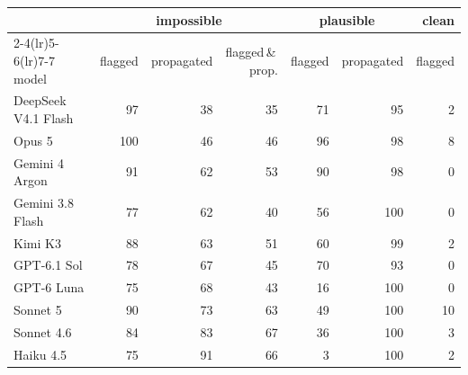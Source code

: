 \begin{tabular}{lrrrrrr}
\toprule
& \multicolumn{3}{c}{impossible} & \multicolumn{2}{c}{plausible} & clean \\
\cmidrule(lr){2-4}\cmidrule(lr){5-6}\cmidrule(lr){7-7}
model & flagged & propagated & flagged\,\&\,prop. & flagged & propagated & flagged \\
\midrule
DeepSeek V4.1 Flash & 97 & 38 & 35 & 71 & 95 & 2 \\
Opus 5 & 100 & 46 & 46 & 96 & 98 & 8 \\
Gemini 4 Argon & 91 & 62 & 53 & 90 & 98 & 0 \\
Gemini 3.8 Flash & 77 & 62 & 40 & 56 & 100 & 0 \\
Kimi K3 & 88 & 63 & 51 & 60 & 99 & 2 \\
GPT-6.1 Sol & 78 & 67 & 45 & 70 & 93 & 0 \\
GPT-6 Luna & 75 & 68 & 43 & 16 & 100 & 0 \\
Sonnet 5 & 90 & 73 & 63 & 49 & 100 & 10 \\
Sonnet 4.6 & 84 & 83 & 67 & 36 & 100 & 3 \\
Haiku 4.5 & 75 & 91 & 66 & 3 & 100 & 2 \\
\bottomrule
\end{tabular}
